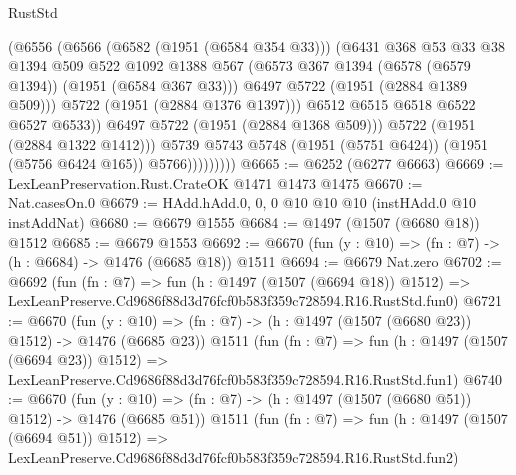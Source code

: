 \begin{lexlean}{RustStd}
\begin{coremodule}
                            (@6556
                              (@6566
                                (@6582 (@1951 (@6584 @354 @33)))
                                (@6431
                                  @368
                                  @53
                                  @33
                                  @38
                                  @1394
                                  @509
                                  @522
                                  @1092
                                  @1388
                                  @567
                                  (@6573 @367 @1394 (@6578 (@6579 @1394)) (@1951 (@6584 @367 @33)))
                                  @6497
                                  @5722
                                  (@1951 (@2884 @1389 @509)))
                                @5722
                                (@1951 (@2884 @1376 @1397)))
                              @6512
                              @6515
                              @6518
                              @6522
                              @6527
                              @6533))
                          @6497
                          @5722
                          (@1951 (@2884 @1368 @509)))
                        @5722
                        (@1951 (@2884 @1322 @1412)))
                      @5739
                      @5743
                      @5748
                      (@1951 (@5751 @6424))
                      (@1951 (@5756 @6424 @165))
                      @5766)))))))))
@6665 := @6252 (@6277 @6663)
@6669 := LexLeanPreservation.Rust.CrateOK @1471 @1473 @1475
@6670 := Nat.casesOn.{0}
@6679 := HAdd.hAdd.{0, 0, 0} @10 @10 @10 (instHAdd.{0} @10 instAddNat)
@6680 := @6679 @1555
@6684 := @1497 (@1507 (@6680 @18)) @1512
@6685 := @6679 @1553
@6692 := @6670 (fun (y : @10) => (fn : @7) -> (h : @6684) -> @1476 (@6685 @18)) @1511
@6694 := @6679 Nat.zero
@6702 := @6692
    (fun (fn : @7) =>
    fun (h : @1497 (@1507 (@6694 @18)) @1512) =>
    LexLeanPreserve.Cd9686f88d3d76fcf0b583f359c728594.R16.RustStd.fun0)
@6721 := @6670
    (fun (y : @10) => (fn : @7) -> (h : @1497 (@1507 (@6680 @23)) @1512) -> @1476 (@6685 @23))
    @1511
    (fun (fn : @7) =>
    fun (h : @1497 (@1507 (@6694 @23)) @1512) =>
    LexLeanPreserve.Cd9686f88d3d76fcf0b583f359c728594.R16.RustStd.fun1)
@6740 := @6670
    (fun (y : @10) => (fn : @7) -> (h : @1497 (@1507 (@6680 @51)) @1512) -> @1476 (@6685 @51))
    @1511
    (fun (fn : @7) =>
    fun (h : @1497 (@1507 (@6694 @51)) @1512) =>
    LexLeanPreserve.Cd9686f88d3d76fcf0b583f359c728594.R16.RustStd.fun2)

\end{coremodule}
\end{lexlean}
